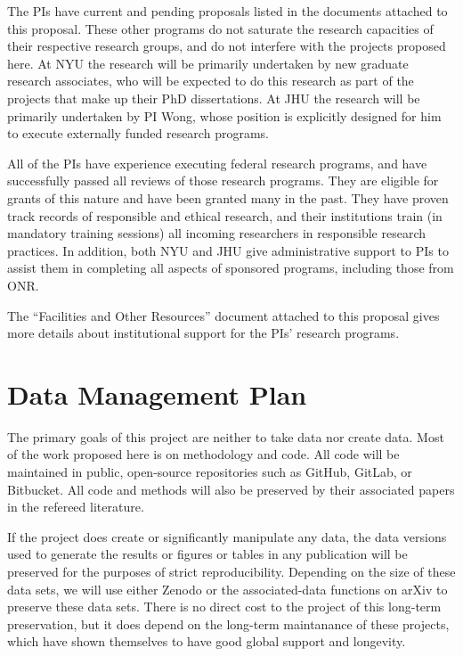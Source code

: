 \documentclass[11pt]{article}
\begin{document}
The PIs have current and pending proposals listed in the documents attached to this proposal.
These other programs do not saturate the research capacities of their respective research groups, and do not interfere with the projects proposed here.
At NYU the research will be primarily undertaken by new graduate research associates, who will be expected to do this research as part of the projects that make up their PhD dissertations.
At JHU the research will be primarily undertaken by PI Wong, whose position is explicitly designed for him to execute externally funded research programs.

All of the PIs have experience executing federal research programs, and have successfully passed all reviews of those research programs.
They are eligible for grants of this nature and have been granted many in the past.
They have proven track records of responsible and ethical research, and their institutions train (in mandatory training sessions) all incoming researchers in responsible research practices.
In addition, both NYU and JHU give administrative support to PIs to assist them in completing all aspects of sponsored programs, including those from ONR.

The ``Facilities and Other Resources'' document attached to this proposal gives more details about institutional support for the PIs' research programs.

\section{Data Management Plan}
The primary goals of this project are neither to take data nor create data.
Most of the work proposed here is on methodology and code.
All code will be maintained in public, open-source repositories such as GitHub, GitLab, or Bitbucket.
All code and methods will also be preserved by their associated papers in the refereed literature.

If the project does create or significantly manipulate any data,
the data versions used to generate the results or figures or tables in any publication will be preserved for the purposes of strict reproducibility.
Depending on the size of these data sets, we will use either Zenodo or the associated-data functions on arXiv to preserve these data sets.
There is no direct cost to the project of this long-term preservation, but it does depend on the long-term maintanance of these projects, which have shown themselves to have good global support and longevity.
\end{document}
